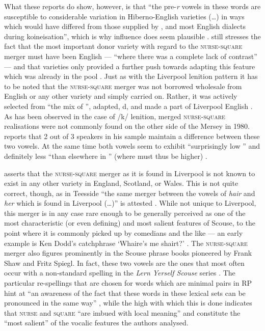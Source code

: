 What these reports do show, however, is that ``the pre-\emph{r} vowels in these words are susceptible to considerable variation in Hiberno-English varieties (\ldots) in ways which would have differed from those supplied by ,  and most English dialects during koineisation'', which is why  influence does seem plausible \citep[128]{honeybone2007}.
\textcite{honeybone2007} still stresses the fact that the most important donor variety with regard to the \textsc{nurse}-\textsc{square} merger must have been  English --- ``where there was a complete lack of contrast'' --- and that  varieties only provided a further push towards adapting this feature which was already in the pool \citep[129]{honeybone2007}.
Just as with the Liverpool lenition pattern it has to be noted that the \textsc{nurse}-\textsc{square} merger was not borrowed wholesale from  English or any other variety and simply carried on. 
Rather, it was actively selected from ``the mix of '', adapted, d, and made a part of Liverpool English \parencite[cf.][129]{honeybone2007}.
As has been observed in the case of /k/ lenition, merged \textsc{nurse}-\textsc{square} realisations were not commonly found on the other side of the Mersey in 1980.
\textcite[95]{newbrook1999} reports that 2 out of 3 speakers in his sample maintain a difference between these two vowels.
At the same time both vowels seem to exhibit ``surprisingly low '' and definitely less ``than elsewhere in '' (where  must thus be higher) \parencite[95]{newbrook1999}.

\citet[cf.][128]{honeybone2007} asserts that the \textsc{nurse}-\textsc{square} merger as it is found in Liverpool is not known to exist in any other variety in England, Scotland, or Wales.
This is not quite correct, though, as in Teesside ``the same merger between the vowels of \emph{hair} and \emph{her} which is found in Liverpool (\dots)'' is attested \parencite[70]{trudgill1999}.
While not unique to Liverpool, this merger is in any case rare enough to be generally perceived as one of the most characteristic (or even defining) and most salient features of Scouse, to the point where it is commonly picked up by comedians and the like --- an early example is Ken Dodd's catchphrase `Whaire's me shairt?' \citep[cf.][73]{trudgill1999}.
The \textsc{nurse}-\textsc{square} merger also figures prominently in the Scouse phrase books pioneered by Frank Shaw and Fritz Spiegl.
In fact, these two vowels are the ones that most often occur with a non-standard spelling in the \emph{Lern Yerself Scouse} series \parencite[cf.][322]{honeybonewatson2013}.
The particular re-spellings that are chosen for words which are minimal pairs in RP hint at ``an awareness of the fact that these words in these lexical sets can be pronounced in the same way'' \parencite[324]{honeybonewatson2013}, while the high  with which this is done indicates that \textsc{nurse} and \textsc{square} ``are imbued with local meaning'' and constitute the ``most salient'' of the vocalic features the authors analysed.

